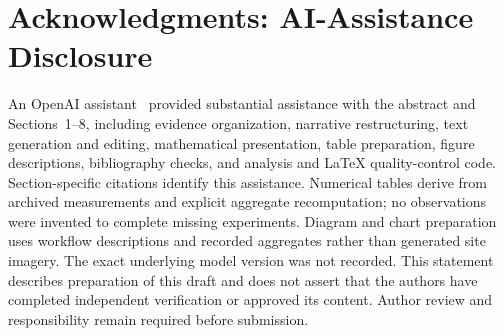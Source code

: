 \documentclass{llncs}
\begin{document}
\section*{Acknowledgments: AI-Assistance Disclosure}
An OpenAI assistant~\cite{openai2026} provided substantial assistance with the abstract and Sections~1--8, including evidence organization, narrative restructuring, text generation and editing, mathematical presentation, table preparation, figure descriptions, bibliography checks, and analysis and LaTeX quality-control code. Section-specific citations identify this assistance. Numerical tables derive from archived measurements and explicit aggregate recomputation; no observations were invented to complete missing experiments. Diagram and chart preparation uses workflow descriptions and recorded aggregates rather than generated site imagery. The exact underlying model version was not recorded. This statement describes preparation of this draft and does not assert that the authors have completed independent verification or approved its content. Author review and responsibility remain required before submission.

\FloatBarrier


\end{document}
